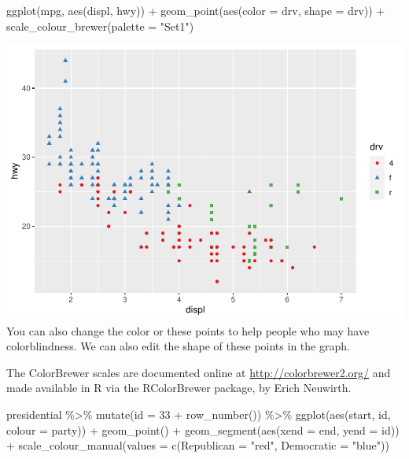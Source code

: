 \documentclass[
]{article}
\newenvironment{Shaded}{\begin{snugshade}}{\end{snugshade}}
\newcommand{\AttributeTok}[1]{\textcolor[rgb]{0.77,0.63,0.00}{#1}}
\newcommand{\DecValTok}[1]{\textcolor[rgb]{0.00,0.00,0.81}{#1}}
\newcommand{\FunctionTok}[1]{\textcolor[rgb]{0.00,0.00,0.00}{#1}}
\newcommand{\NormalTok}[1]{#1}
\newcommand{\SpecialCharTok}[1]{\textcolor[rgb]{0.00,0.00,0.00}{#1}}
\newcommand{\StringTok}[1]{\textcolor[rgb]{0.31,0.60,0.02}{#1}}
\begin{document}
\begin{Shaded}
\begin{Highlighting}[]
\FunctionTok{ggplot}\NormalTok{(mpg, }\FunctionTok{aes}\NormalTok{(displ, hwy)) }\SpecialCharTok{+}
  \FunctionTok{geom\_point}\NormalTok{(}\FunctionTok{aes}\NormalTok{(}\AttributeTok{color =}\NormalTok{ drv, }\AttributeTok{shape =}\NormalTok{ drv)) }\SpecialCharTok{+}
  \FunctionTok{scale\_colour\_brewer}\NormalTok{(}\AttributeTok{palette =} \StringTok{"Set1"}\NormalTok{)}
\end{Highlighting}
\end{Shaded}

\includegraphics{Journal_files/figure-latex/unnamed-chunk-65-3.pdf} You
can also change the color or these points to help people who may have
colorblindness. We can also edit the shape of these points in the graph.

The ColorBrewer scales are documented online at
\url{http://colorbrewer2.org/} and made available in R via the
RColorBrewer package, by Erich Neuwirth.

\begin{Shaded}
\begin{Highlighting}[]
\NormalTok{presidential }\SpecialCharTok{\%\textgreater{}\%}
  \FunctionTok{mutate}\NormalTok{(}\AttributeTok{id =} \DecValTok{33} \SpecialCharTok{+} \FunctionTok{row\_number}\NormalTok{()) }\SpecialCharTok{\%\textgreater{}\%}
  \FunctionTok{ggplot}\NormalTok{(}\FunctionTok{aes}\NormalTok{(start, id, }\AttributeTok{colour =}\NormalTok{ party)) }\SpecialCharTok{+}
    \FunctionTok{geom\_point}\NormalTok{() }\SpecialCharTok{+}
    \FunctionTok{geom\_segment}\NormalTok{(}\FunctionTok{aes}\NormalTok{(}\AttributeTok{xend =}\NormalTok{ end, }\AttributeTok{yend =}\NormalTok{ id)) }\SpecialCharTok{+}
    \FunctionTok{scale\_colour\_manual}\NormalTok{(}\AttributeTok{values =} \FunctionTok{c}\NormalTok{(}\AttributeTok{Republican =} \StringTok{"red"}\NormalTok{, }\AttributeTok{Democratic =} \StringTok{"blue"}\NormalTok{))}
\end{Highlighting}
\end{Shaded}
\end{document}
